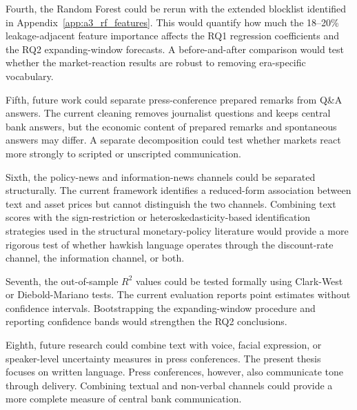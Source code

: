 Fourth, the Random Forest could be rerun with the extended blocklist identified
in Appendix~\ref{app:a3_rf_features}. This would quantify how much the 18--20\%
leakage-adjacent feature importance affects the RQ1 regression coefficients and
the RQ2 expanding-window forecasts. A before-and-after comparison would test
whether the market-reaction results are robust to removing era-specific
vocabulary.

Fifth, future work could separate press-conference prepared remarks from Q\&A
answers. The current cleaning removes journalist questions and keeps central
bank answers, but the economic content of prepared remarks and spontaneous
answers may differ. A separate decomposition could test whether markets react
more strongly to scripted or unscripted communication.

Sixth, the policy-news and information-news channels could be separated
structurally. The current framework identifies a reduced-form association
between text and asset prices but cannot distinguish the two channels.
Combining text scores with the sign-restriction or heteroskedasticity-based
identification strategies used in the structural monetary-policy literature
would provide a more rigorous test of whether hawkish language operates through
the discount-rate channel, the information channel, or both.

Seventh, the out-of-sample $R^2$ values could be tested formally using
Clark-West or Diebold-Mariano tests. The current evaluation reports point
estimates without confidence intervals. Bootstrapping the expanding-window
procedure and reporting confidence bands would strengthen the RQ2 conclusions.

Eighth, future research could combine text with voice, facial expression, or
speaker-level uncertainty measures in press conferences. The present thesis
focuses on written language. Press conferences, however, also communicate tone
through delivery. Combining textual and non-verbal channels could provide a more
complete measure of central bank communication.